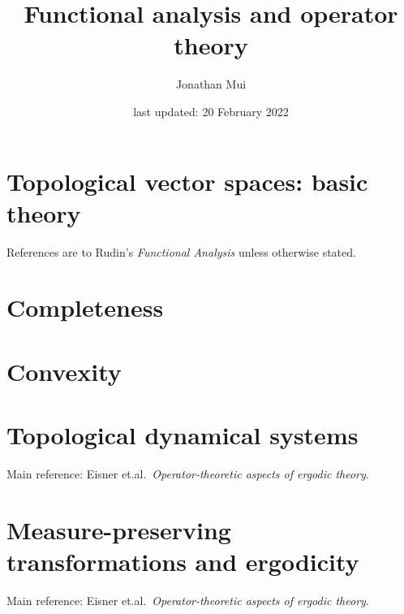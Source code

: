 \documentclass[11pt]{article}
\title{Functional analysis and operator theory}
\author{Jonathan Mui}
\date{last updated: 20 February 2022}
\begin{document}
	
	\maketitle
	
	\tableofcontents
	
	\section{Topological vector spaces: basic theory}
	References are to Rudin's \emph{Functional Analysis} unless otherwise stated.
	
	
	\section{Completeness}
	
	
	\section{Convexity}
	
	
	\section{Topological dynamical systems}
	Main reference: Eisner et.al.\, \emph{Operator-theoretic aspects of ergodic theory}.
	
	
	\section{Measure-preserving transformations and ergodicity}
	Main reference: Eisner et.al.\ \emph{Operator-theoretic aspects of ergodic theory}.
	
	
\end{document}
